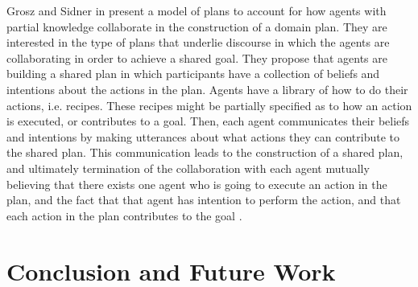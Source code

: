 Grosz and Sidner in \cite{grosz:plans-discourse} present a model of plans to
account for how agents with partial knowledge collaborate in the construction of
a domain plan. They are interested in the type of plans that underlie discourse
in which the agents are collaborating in order to achieve a shared goal. They
propose that agents are building a shared plan in which participants have a
collection of beliefs and intentions about the actions in the plan. Agents have
a library of how to do their actions, i.e. recipes. These recipes might be
partially specified as to how an action is executed, or contributes to a goal.
Then, each agent communicates their beliefs and intentions by making utterances
about what actions they can contribute to the shared plan. This communication
leads to the construction of a shared plan, and ultimately termination of the
collaboration with each agent mutually believing that there exists one agent who
is going to execute an action in the plan, and the fact that that agent has
intention to perform the action, and that each action in the plan contributes to
the goal \cite{grosz:plans-discourse,lochbaum:plan-models}.

\section{Conclusion and Future Work}

